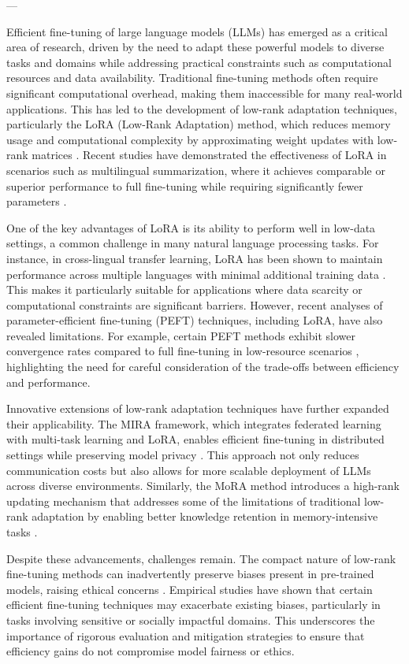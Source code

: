 \documentclass[conference]{IEEEtran}
\begin{document}
---

Efficient fine-tuning of large language models (LLMs) has emerged as a critical area of research, driven by the need to adapt these powerful models to diverse tasks and domains while addressing practical constraints such as computational resources and data availability. Traditional fine-tuning methods often require significant computational overhead, making them inaccessible for many real-world applications. This has led to the development of low-rank adaptation techniques, particularly the LoRA (Low-Rank Adaptation) method, which reduces memory usage and computational complexity by approximating weight updates with low-rank matrices \cite{bX}. Recent studies have demonstrated the effectiveness of LoRA in scenarios such as multilingual summarization, where it achieves comparable or superior performance to full fine-tuning while requiring significantly fewer parameters \cite{bX}.

One of the key advantages of LoRA is its ability to perform well in low-data settings, a common challenge in many natural language processing tasks. For instance, in cross-lingual transfer learning, LoRA has been shown to maintain performance across multiple languages with minimal additional training data \cite{bX}. This makes it particularly suitable for applications where data scarcity or computational constraints are significant barriers. However, recent analyses of parameter-efficient fine-tuning (PEFT) techniques, including LoRA, have also revealed limitations. For example, certain PEFT methods exhibit slower convergence rates compared to full fine-tuning in low-resource scenarios \cite{bX}, highlighting the need for careful consideration of the trade-offs between efficiency and performance.

Innovative extensions of low-rank adaptation techniques have further expanded their applicability. The MIRA framework, which integrates federated learning with multi-task learning and LoRA, enables efficient fine-tuning in distributed settings while preserving model privacy \cite{bX}. This approach not only reduces communication costs but also allows for more scalable deployment of LLMs across diverse environments. Similarly, the MoRA method introduces a high-rank updating mechanism that addresses some of the limitations of traditional low-rank adaptation by enabling better knowledge retention in memory-intensive tasks \cite{bX}.

Despite these advancements, challenges remain. The compact nature of low-rank fine-tuning methods can inadvertently preserve biases present in pre-trained models, raising ethical concerns \cite{bX}. Empirical studies have shown that certain efficient fine-tuning techniques may exacerbate existing biases, particularly in tasks involving sensitive or socially impactful domains. This underscores the importance of rigorous evaluation and mitigation strategies to ensure that efficiency gains do not compromise model fairness or ethics.
\end{document}
